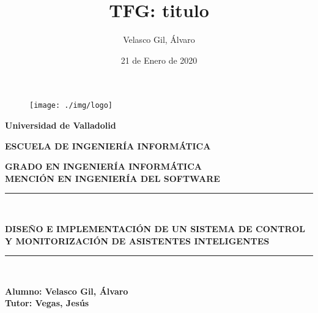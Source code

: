 \documentclass[openright,twoside,10pt]{book}
\date{21 de Enero de 2020}
\author{Velasco Gil, Álvaro}
\title{TFG: titulo}
\begin{document}
\begin{titlepage}

\begin{center}
\vspace*{-1in}
\begin{figure}[htb]
\begin{center}
\texttt{[image: ./img/logo]}
\end{center}
\end{figure}
\begin{large}
\textbf{Universidad de Valladolid}
\end{large}

\vspace*{0.15in}

\vspace*{0.6in}
\begin{large}
\textbf{ESCUELA DE INGENIERÍA INFORMÁTICA}

\end{large}
\vspace*{0.2in}
\textbf{ GRADO EN INGENIERÍA INFORMÁTICA}\\
\textbf{ MENCIÓN EN INGENIERÍA DEL SOFTWARE }
\vspace*{0.1in}
\rule{140mm}{0.1mm}\\
\vspace*{0.2in}
\begin{large}
\textbf{{\LARGE DISEÑO E IMPLEMENTACIÓN DE UN SISTEMA DE CONTROL Y MONITORIZACIÓN DE ASISTENTES INTELIGENTES\\}}
\end{large}
\vspace*{0.2in}
\rule{140mm}{0.1mm}\\
\vspace*{2in}
\begin{large}
\begin{flushright}
\textbf{Alumno: Velasco Gil, Álvaro \\
\vspace*{0.3in}
Tutor: Vegas, Jesús }
\end{flushright}
\end{large}
\end{center}

\end{titlepage}

\newpage
\mbox{}	
\thispagestyle{empty} %

\chapter*{}

\end{document}
